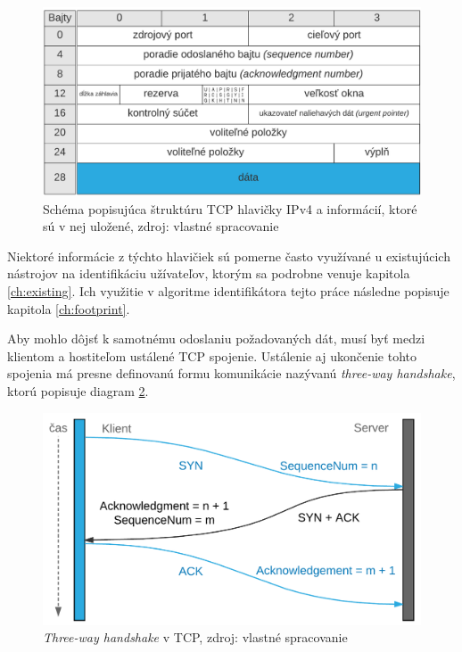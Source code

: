 \documentclass[
  digital, %
  oneside, %
  table,   %
  lof,     %
  nolot,   %
  nocover
]{fithesis3}
\begin{document}
\begin{figure}[h]
  \centering
    \includegraphics[width=.95\textwidth]{images/net-tcp-head.png}
  \caption{Schéma popisujúca štruktúru TCP hlavičky IPv4 a informácií, ktoré sú v
  nej uložené, zdroj: vlastné spracovanie}
  \label{fig:net-tcp-head}
\end{figure}

Niektoré informácie z týchto hlavičiek sú pomerne často využívané u existujúcich
nástrojov na identifikáciu užívateľov, ktorým sa podrobne venuje kapitola
\ref{ch:existing}. Ich využitie v algoritme identifikátora tejto práce následne
popisuje kapitola \ref{ch:footprint}.

Aby mohlo dôjsť k samotnému odoslaniu požadovaných dát, musí byť medzi klientom
a hostiteľom ustálené TCP spojenie. Ustálenie aj ukončenie tohto spojenia má
presne definovanú formu komunikácie nazývanú \textit{three-way handshake}, ktorú
popisuje diagram \ref{fig:net-tcp-flow}.

\begin{figure}[h]
  \centering
    \includegraphics[width=.90\textwidth]{images/net-tcp-flow.png}
  \caption{\textit{Three-way handshake} v TCP, zdroj: vlastné spracovanie}
  \label{fig:net-tcp-flow}
\end{figure}
\end{document}
